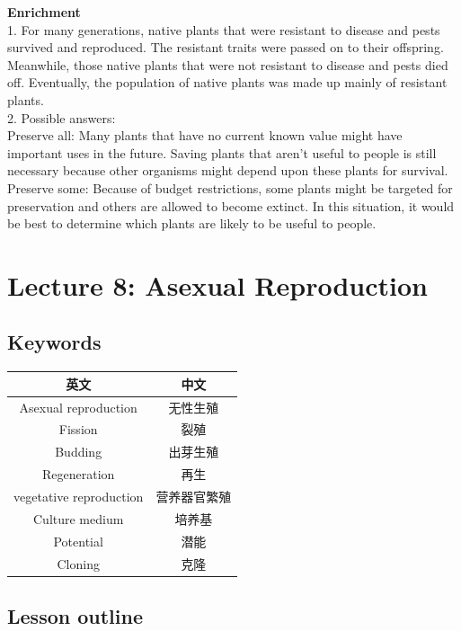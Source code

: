 \documentclass[
]{book}
\begin{document}
\textbf{Enrichment}\\
1. For many generations, {native plants that were resistant to disease and pests} survived and reproduced. The resistant traits were passed on to their offspring. Meanwhile, {those native plants that were not resistant to disease and pests} died off. Eventually, the population of native plants was made up mainly of resistant plants.\\
2. Possible answers:\\
Preserve all: Many plants that have no current known value might have important uses in the future. Saving plants that aren't useful to people is still necessary because other organisms might depend upon these plants for survival.\\
Preserve some: Because of budget restrictions, some plants might be targeted for preservation and others are allowed to become extinct. In this situation, it would be best to determine which plants are likely to be useful to people.

\hypertarget{lecture-8-asexual-reproduction}{%
\section{Lecture 8: Asexual Reproduction}\label{lecture-8-asexual-reproduction}}

\hypertarget{keywords-1}{%
\subsection{Keywords}\label{keywords-1}}

\begin{longtable}[]{@{}cc@{}}
\toprule\noalign{}
英文 & 中文 \\
\midrule\noalign{}
\endhead
\bottomrule\noalign{}
\endlastfoot
Asexual reproduction & 无性生殖 \\
Fission & 裂殖 \\
Budding & 出芽生殖 \\
Regeneration & 再生 \\
vegetative reproduction & 营养器官繁殖 \\
Culture medium & 培养基 \\
Potential & 潜能 \\
Cloning & 克隆 \\
\end{longtable}

\hypertarget{lesson-outline-4}{%
\subsection{Lesson outline}\label{lesson-outline-4}}
\end{document}
